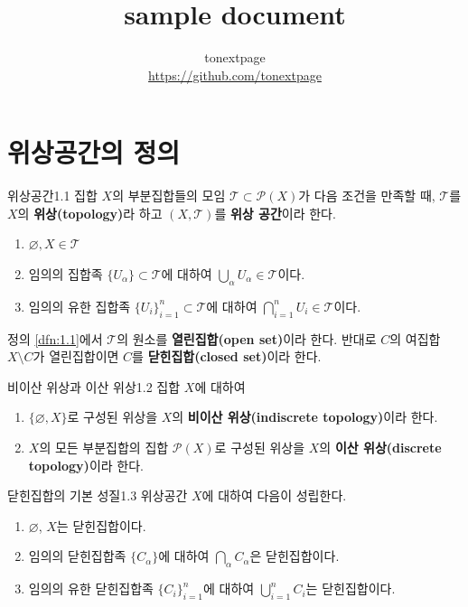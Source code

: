 \documentclass{article}
\title{sample document}
\author{tonextpage\\
    \url{https://github.com/tonextpage}
}
\date{}
\begin{document}

\section{위상공간의 정의}
\begin{dfn}{위상공간}{1.1}
  집합 $X$의 부분집합들의 모임 ${\mathcal T}\subset{\mathcal P}(X)$가 다음 조건을 만족할 때, $\mathcal T$를 $X$의 \textbf{위상(topology)}라 하고 $(X,{\mathcal T})$를 \textbf{위상 공간}이라 한다.
  \begin{enumerate}[(1)]
    \item $\varnothing,X\in\mathcal T$
    \item 임의의 집합족 $\{U_\alpha\}\subset\mathcal T$에 대하여 $\bigcup_\alpha U_\alpha\in\mathcal T$이다.
    \item 임의의 유한 집합족 $\{U_i\}_{i=1}^n\subset\mathcal T$에 대하여 $\bigcap_{i=1}^nU_i\in\mathcal T$이다.
  \end{enumerate}
\end{dfn}
정의 \ref{dfn:1.1}에서 $\mathcal T$의 원소를 \textbf{열린집합(open set)}이라 한다. 반대로 $C$의 여집합 $X\setminus C$가 열린집합이면 $C$를 \textbf{닫힌집합(closed set)}이라 한다.

\begin{example}{비이산 위상과 이산 위상}{1.2}
  집합 $X$에 대하여
  \begin{enumerate}[(1)]
    \item $\{\varnothing,X\}$로 구성된 위상을 $X$의 \textbf{비이산 위상(indiscrete topology)}이라 한다.
    \item $X$의 모든 부분집합의 집합 ${\mathcal P}(X)$로 구성된 위상을 $X$의 \textbf{이산 위상(discrete topology)}이라 한다.
  \end{enumerate}
\end{example}

\begin{thm}{닫힌집합의 기본 성질}{1.3}
  위상공간 $X$에 대하여 다음이 성립한다.
  \begin{enumerate}[(1)]
    \item $\varnothing$, $X$는 닫힌집합이다.
    \item 임의의 닫힌집합족 $\{C_\alpha\}$에 대하여 $\bigcap_\alpha C_\alpha$은 닫힌집합이다.
    \item 임의의 유한 닫힌집합족 $\{C_i\}_{i=1}^n$에 대하여 $\bigcup_{i=1}^nC_i$는 닫힌집합이다.
  \end{enumerate}
\end{thm}
\end{document}
